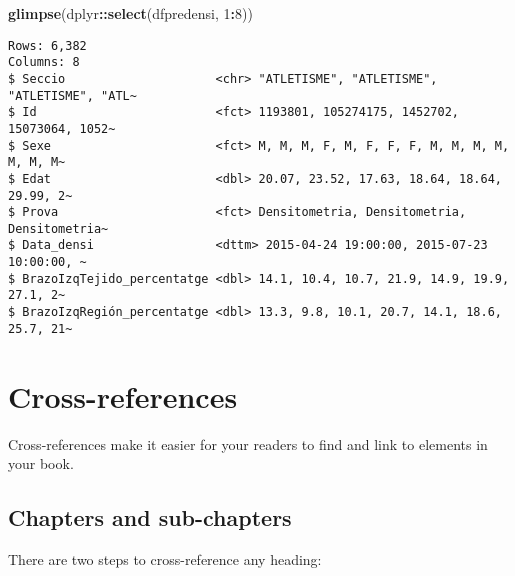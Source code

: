 \documentclass[
]{book}
\newenvironment{Shaded}{\begin{snugshade}}{\end{snugshade}}
\newcommand{\DecValTok}[1]{\textcolor[rgb]{0.00,0.00,0.81}{#1}}
\newcommand{\FunctionTok}[1]{\textcolor[rgb]{0.13,0.29,0.53}{\textbf{#1}}}
\newcommand{\NormalTok}[1]{#1}
\newcommand{\SpecialCharTok}[1]{\textcolor[rgb]{0.81,0.36,0.00}{\textbf{#1}}}
\theoremstyle{definition}
\theoremstyle{definition}
\theoremstyle{definition}
\theoremstyle{definition}
\theoremstyle{remark}
\begin{document}
\begin{Shaded}
\begin{Highlighting}[]
\FunctionTok{glimpse}\NormalTok{(dplyr}\SpecialCharTok{::}\FunctionTok{select}\NormalTok{(dfpredensi, }\DecValTok{1}\SpecialCharTok{:}\DecValTok{8}\NormalTok{))}
\end{Highlighting}
\end{Shaded}

\begin{verbatim}
Rows: 6,382
Columns: 8
$ Seccio                     <chr> "ATLETISME", "ATLETISME", "ATLETISME", "ATL~
$ Id                         <fct> 1193801, 105274175, 1452702, 15073064, 1052~
$ Sexe                       <fct> M, M, M, F, M, F, F, F, M, M, M, M, M, M, M~
$ Edat                       <dbl> 20.07, 23.52, 17.63, 18.64, 18.64, 29.99, 2~
$ Prova                      <fct> Densitometria, Densitometria, Densitometria~
$ Data_densi                 <dttm> 2015-04-24 19:00:00, 2015-07-23 10:00:00, ~
$ BrazoIzqTejido_percentatge <dbl> 14.1, 10.4, 10.7, 21.9, 14.9, 19.9, 27.1, 2~
$ BrazoIzqRegión_percentatge <dbl> 13.3, 9.8, 10.1, 20.7, 14.1, 18.6, 25.7, 21~
\end{verbatim}

\hypertarget{cross}{%
\chapter{Cross-references}\label{cross}}

Cross-references make it easier for your readers to find and link to elements in your book.

\hypertarget{chapters-and-sub-chapters}{%
\section{Chapters and sub-chapters}\label{chapters-and-sub-chapters}}

There are two steps to cross-reference any heading:
\end{document}

